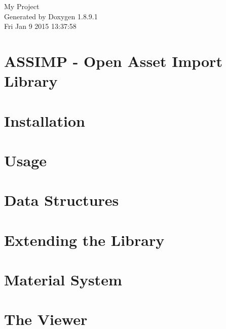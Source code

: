 \documentclass[twoside]{book}
\newcommand{\+}{\discretionary{\mbox{\scriptsize$\hookleftarrow$}}{}{}}
\newcommand{\clearemptydoublepage}{%
  \newpage{\pagestyle{empty}\cleardoublepage}%
}
\begin{document}
\hypersetup{pageanchor=false,
             bookmarks=true,
             bookmarksnumbered=true,
             pdfencoding=unicode
            }
\begin{titlepage}
\vspace*{7cm}
\begin{center}%
{\Large My Project }\\
\vspace*{1cm}
{\large Generated by Doxygen 1.8.9.1}\\
\vspace*{0.5cm}
{\small Fri Jan 9 2015 13:37:58}\\
\end{center}
\end{titlepage}
\clearemptydoublepage
\tableofcontents
\clearemptydoublepage
{}
\hypersetup{pageanchor=true}

\chapter{A\+S\+S\+I\+M\+P -\/ Open Asset Import Library}
\label{index}\hypertarget{index}{}
\chapter{Installation}
\label{install}
\hypertarget{install}{}

\chapter{Usage}
\label{usage}
\hypertarget{usage}{}

\chapter{Data Structures}
\label{data}
\hypertarget{data}{}

\chapter{Extending the Library}
\label{extend}
\hypertarget{extend}{}

\chapter{Material System}
\label{materials}
\hypertarget{materials}{}

\chapter{The Viewer}
\label{viewer}
\hypertarget{viewer}{}

\end{document}

